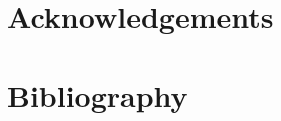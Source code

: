 \documentclass[]{article}
\begin{document}
\section*{Acknowledgements}
\section*{Bibliography}



\cite{1}
\cite{2}
\cite{3}
\cite{4}
\cite{5}
\cite{6}
\cite{7}
\cite{8}
\cite{9}
\cite{10}
\cite{11}
\cite{12}
\cite{13}
\cite{14}
\cite{15}
\cite{16}
\cite{17}
\cite{18}
\cite{19}
\cite{20}
\cite{21}


 
\end{document}
